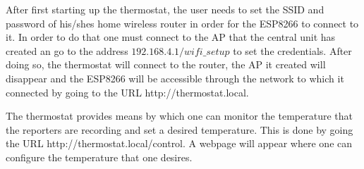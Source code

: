 After first starting up the thermostat, the user needs to set the SSID and password of his/shes home wireless
router in order for the ESP8266 to connect to it. In order to do that one must connect to the AP that the
central unit has created an go to the address $192.168.4.1/wifi\_setup$ to set the credentials.
After doing so, the thermostat will connect to the router, the AP it created will disappear and the ESP8266
will be accessible through the network to which it connected by going to the URL http://thermostat.local.

The thermostat provides means by which one can monitor the temperature that the reporters are recording and
set a desired temperature. This is done by going the URL http://thermostat.local/control. A webpage will
appear where one can configure the temperature that one desires.





